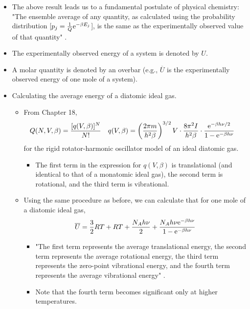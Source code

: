 \documentclass[../notes.tex]{subfiles}
\begin{document}
\begin{itemize}
    \item The above result leads us to a fundamental postulate of physical chemistry: "The ensemble average of any quantity, as calculated using the probability distribution [$p_j=\frac{1}{Q}\e[-\beta E_j]$], is the same as the experimentally observed value of that quantity" \parencite[700]{bib:McQuarrieSimon}.
    \item The experimentally observed energy of a system is denoted by $U$.
    \item A molar quantity is denoted by an overbar (e.g., $\overline{U}$ is the experimentally observed energy of one mole of a system).
    \item Calculating the average energy of a diatomic ideal gas.
    \begin{itemize}
        \item From Chapter 18,
        \begin{align*}
            Q(N,V,\beta) &= \frac{[q(V,\beta)]^N}{N!}&
            q(V,\beta) &= \left( \frac{2\pi m}{h^2\beta} \right)^{3/2}V\cdot\frac{8\pi^2I}{h^2\beta}\cdot\frac{\e[-\beta h\nu/2]}{1-\e[-\beta h\nu]}
        \end{align*}
        for the rigid rotator-harmonic oscillator model of an ideal diatomic gas.
        \begin{itemize}
            \item The first term in the expression for $q(V,\beta)$ is translational (and identical to that of a monatomic ideal gas), the second term is rotational, and the third term is vibrational.
        \end{itemize}
        \item Using the same procedure as before, we can calculate that for one mole of a diatomic ideal gas,
        \begin{equation*}
            \overline{U} = \frac{3}{2}RT+RT+\frac{N_Ah\nu}{2}+\frac{N_Ah\nu\e[-\beta h\nu]}{1-\e[-\beta h\nu]}
        \end{equation*}
        \begin{itemize}
            \item "The first term represents the average translational energy, the second term represents the average rotational energy, the third term represents the zero-point vibrational energy, and the fourth term represents the average vibrational energy" \parencite[701]{bib:McQuarrieSimon}.
            \item Note that the fourth term becomes significant only at higher temperatures. 
        \end{itemize}

\end{itemize}
\end{itemize}
\end{document}
